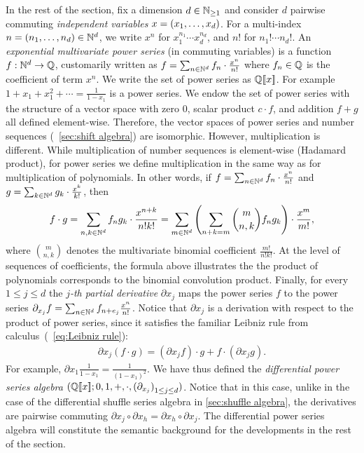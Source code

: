 In the rest of the section, fix a dimension $d \in \mathbb N_{\geq 1}$
and consider $d$ pairwise commuting \emph{independent variables} $x = (x_1, \dots, x_d)$.
%
For a multi-index $n = (n_1, \dots, n_d) \in \mathbb N^d$,
we write $x^n$ for $x_1^{n_1} \cdots x_d^{n_d}$,
and $n!$ for $n_1! \cdots n_d!$.
%
An \emph{exponential multivariate power series} (in commuting variables) is a function $f : \mathbb N^d \to \mathbb Q$,
customarily written as $f = \sum_{n \in \mathbb N^d} f_n \cdot \frac {x^n} {n!}$
where $f_n \in \mathbb Q$ is the coefficient of term $x^n$.
%
We write the set of power series as $\mathbb Q[\![x]\!]$.
%
For example $1 + x_1 + x_1^2 + \cdots = \frac 1 {1 - x_1}$ is a power series.
%
%
We endow the set of power series with the structure of a vector space
with zero $0$, scalar product $c \cdot f$, and addition $f + g$
all defined element-wise.
%
Therefore, the vector spaces of power series and number sequences (\cf~\cref{sec:shift algebra}) are isomorphic.
However, multiplication is different.
%
While multiplication of number sequences is element-wise (Hadamard product),
for power series we define multiplication in the same way as for multiplication of polynomials.
%
In other words, if $f = \sum_{n \in \mathbb N^d} f_n \cdot \frac {x^n} {n!}$ and $g = \sum_{k \in \mathbb N^d} g_k \cdot \frac {x^k} {k!}$,
then 
%
\begin{align*}
    f \cdot g
        = \sum_{n, k \in \mathbb N^d} f_n g_k \cdot \frac {x^{n + k}} {n! k!}
        = \sum_{m \in \mathbb N^d} \left(\sum_{n + k = m} {m \choose n, k} f_n g_k\right) \cdot \frac {x^m} {m!},
\end{align*}
%
where ${m \choose n, k}$ denotes the multivariate binomial coefficient $\frac {m!}{n!k!}$.
%
At the level of sequences of coefficients, the formula above illustrates the the product of polynomials
corresponds to the binomial convolution product.
%
Finally, for every $1 \leq j \leq d$ the \emph{$j$-th partial derivative} $\partial {x_j} {}$
maps the power series $f$ to the power series
$\partial {x_j} f = \sum_{n \in \N^d} f_{n+e_j} \frac {x^n} {n!}$.
%
Notice that $\partial {x_j} {}$ is a derivation with respect to the product of power series,
since it satisfies the familiar Leibniz rule from calculus~(\cf~\cref{eq:Leibniz rule}):
%
\begin{align*}
    \partial {x_j} (f \cdot g) = (\partial {x_j} f) \cdot g + f \cdot (\partial {x_j} g).
\end{align*}
%
For example, $\partial {x_1} {\frac 1 {1 - x_1}} = \frac 1 {(1 - x_1)^2}$.
%
We have thus defined the \emph{differential power series algebra}
$\tuple{\powerseries \Q x; 0, 1, +, \cdot, (\partial {x_j})_{1 \leq j \leq d}}$.
%
Notice that in this case, unlike in the case of the differential shuffle series algebra in \cref{sec:shuffle algebra},
the derivatives are pairwise commuting
$\partial {x_j} {} \circ \partial {x_h} {} = \partial {x_h} {} \circ \partial {x_j} {}$.
%
The differential power series algebra will constitute the semantic background
for the developments in the rest of the section.

